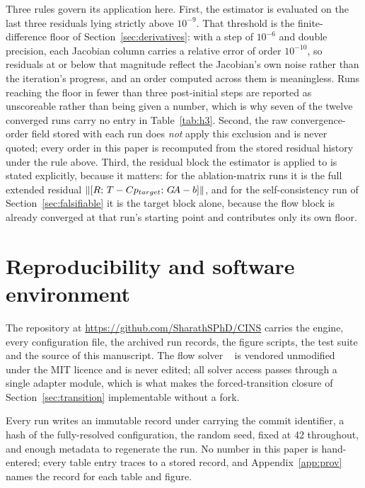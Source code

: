 Three rules govern its application here. First, the estimator is evaluated on
the last three residuals lying strictly above $10^{-9}$. That threshold is the
finite-difference floor of Section~\ref{sec:derivatives}: with a step of
$10^{-6}$ and double precision, each Jacobian column carries a relative error
of order $10^{-10}$, so residuals at or below that magnitude reflect the
Jacobian's own noise rather than the iteration's progress, and an order
computed across them is meaningless. Runs reaching the floor in fewer than
three post-initial steps are reported as unscoreable rather than being given a
number, which is why seven of the twelve converged runs carry no entry in
Table~\ref{tab:h3}. Second, the raw convergence-order field stored with each
run does \emph{not} apply this exclusion and is never quoted; every order in
this paper is recomputed from the stored residual history under the rule
above. Third, the residual block the estimator is applied to is stated
explicitly, because it matters: for the ablation-matrix runs it is the full
extended residual $\left\|[R;\,T-Cp_{target};\,G\!A-b]\right\|$, and for the
self-consistency run of Section~\ref{sec:falsifiable} it is the target block
alone, because the flow block is already converged at that run's starting
point and contributes only its own floor.

\section{Reproducibility and software environment}
\label{app:repro}

The repository at \url{https://github.com/SharathSPhD/CINS} carries the
engine, every configuration file, the archived run records, the figure
scripts, the test suite and the source of this manuscript. The flow solver
~\citep{fidkowski2022coupled} is vendored
unmodified under the MIT licence and is never edited; all solver access passes
through a single adapter module, which is what makes the forced-transition
closure of Section~\ref{sec:transition} implementable without a fork.

Every run writes an immutable record under  carrying
the commit identifier, a hash of the fully-resolved configuration, the random
seed, fixed at 42 throughout, and enough metadata to regenerate the run. No
number in this paper is hand-entered; every table entry traces to a stored
record, and Appendix~\ref{app:prov} names the record for each table and
figure.

